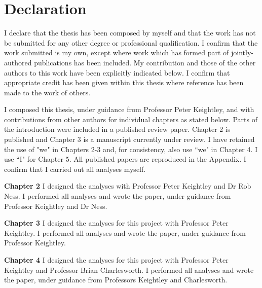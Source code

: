 \chapter{Declaration}

\noindent
I declare that the thesis has been composed by myself and that the work has not be
submitted for any other degree or professional qualification. I confirm that the work
submitted is my own, except where work which has formed part of jointly-authored
publications has been included. My contribution and those of the other authors to this
work have been explicitly indicated below. I confirm that appropriate credit has been
given within this thesis where reference has been made to the work of others.

\noindent
I composed this thesis, under guidance from Professor Peter Keightley, and with contributions from other authors for individual chapters as stated below. Parts of the introduction were included in a published review paper. Chapter 2 is published and Chapter 3 is a manuscript currently under review. I have retained the use of "we" in Chapters 2-3 and, for consistency, also use ``we" in Chapter 4. I use ``I" for Chapter 5. All published papers are reproduced in the Appendix. I confirm that I carried out all analyses myself.

\noindent
\textbf{Chapter 2}
\noindent
I designed the analyses with Professor Peter Keightley and Dr Rob Ness. I performed all analyses and wrote the paper, under guidance from Professor Keightley and Dr Ness.

\noindent
\textbf{Chapter 3}
\noindent
I designed the analyses for this project with Professor Peter Keightley. I performed all analyses and wrote the paper, under guidance from Professor Keightley.

\noindent
\textbf{Chapter 4}
\noindent
I designed the analyses for this project with Professor Peter Keightley and Professor Brian Charlesworth. I performed all analyses and wrote the paper, under guidance from Professors Keightley and Charlesworth.
